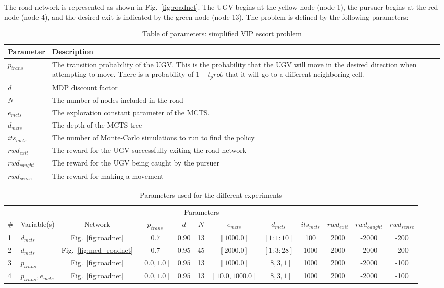 The road network is represented as shown in Fig.~\ref{fig:roadnet}. The UGV begins at the yellow node (node 1), the pursuer begins at the red node (node 4), and the desired exit is indicated by the green node (node 13). The problem is defined by the following parameters:

\tymin=80pt
\begin{table}[tbp]
\footnotesize
\caption{Table of parameters: simplified VIP escort problem}
\begin{tabulary}{\linewidth}{LL}
\hline
Parameter    & Description\\
\hline
$p_{trans}$    & The transition probability of the UGV. This is the probability that the UGV will move in the desired direction when attempting to move. There is a probability of $1-t_prob$ that it will go to a different neighboring cell. \\
$d$            & MDP discount factor\\
$N$            & The number of nodes included in the road\\
$e_{mcts}$     & The exploration constant parameter of the MCTS.\\
$d_{mcts}$     & The depth of the MCTS tree\\
$its_{mcts}$   & The number of Monte-Carlo simulations to run to find the policy\\
$rwd_{exit}$   & The reward for the UGV successfully exiting the road network\\
$rwd_{caught}$ & The reward for the UGV being caught by the pursuer\\
$rwd_{sense}$  & The reward for making a movement\\
\hline
\end{tabulary}
\end{table}
\begin{table}
    \footnotesize
    \centering
    \caption{Parameters used for the different experiments}
    \label{tab:exps}
    \begin{tabular}{llcccccccccc} \toprule
        &\multicolumn{10}{c}{Parameters} \\ \cmidrule(r){3-12}
        \#  & Variable(s) & Network &$p_{trans}$&$d$&$N$&$e_{mcts}$&$d_{mcts}$&$its_{mcts}$&$rwd_{exit}$&$rwd_{caught}$&$rwd_{sense}$ \\ \midrule
        1 & ${d_{mcts}}$ & Fig.~\ref{fig:roadnet} & $0.7$ & $0.90$ & 13 & $[1000.0]$ & $[1:1:10]$ & 100 & 2000 & -2000 & -200\\
        2 & ${d_{mcts}}$ & Fig.~\ref{fig:med_roadnet} & $0.7$ & $0.95$ & 45 & $[2000.0]$ & $[1:3:28]$ & 1000 & 2000 & -2000 & -200\\
        3 & ${p_{trans}}$& Fig.~\ref{fig:roadnet} & $[0.0,1.0]$ & $0.95$ & 13 & $[1000.0]$ & $[8,3,1]$ & 1000 & 2000 & -2000 & -100\\
        4 & ${p_{trans},e_{mcts}}$ & Fig.~\ref{fig:roadnet} & $[0.0,1.0]$ & $0.95$ & 13 & $[10.0,1000.0]$ & $[8,3,1]$ & 1000 & 2000 & -2000 & -100\\
    \end{tabular}
\end{table}

